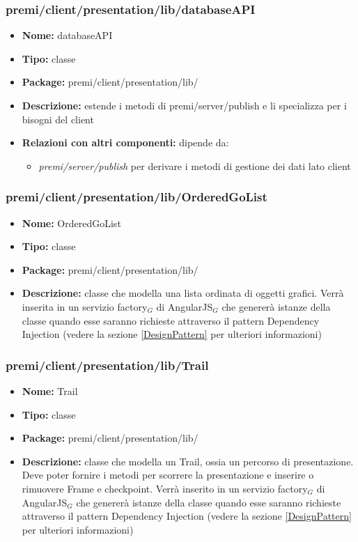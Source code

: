 \subsubsection{premi/client/presentation/lib/databaseAPI}
\begin{itemize}
  \item[] \textbf{Nome:} databaseAPI
  \item[] \textbf{Tipo:} classe
  \item[] \textbf{Package:} premi/client/presentation/lib/
  \item[] \textbf{Descrizione:} estende i metodi di premi/server/publish e li specializza per i bisogni del client
   \item[] \textbf{Relazioni con altri componenti:} dipende da:
 \begin{itemize}
 \item \textit{premi/server/publish} per derivare i metodi di gestione dei dati lato client
 \end{itemize}
\end{itemize}


\subsubsection{premi/client/presentation/lib/OrderedGoList}
\begin{itemize}
  \item[] \textbf{Nome:} OrderedGoList
  \item[] \textbf{Tipo:} classe
  \item[] \textbf{Package:} premi/client/presentation/lib/
  \item[] \textbf{Descrizione:} classe che modella una lista ordinata di oggetti grafici. Verrà inserita in un servizio factory$_G$ di AngularJS$_G$ che genererà istanze della classe quando esse saranno richieste attraverso il pattern Dependency Injection (vedere la sezione \ref{DesignPattern} per ulteriori informazioni)
\end{itemize}
  
\subsubsection{premi/client/presentation/lib/Trail}
\begin{itemize}
  \item[] \textbf{Nome:} Trail
  \item[] \textbf{Tipo:} classe
  \item[] \textbf{Package:} premi/client/presentation/lib/
  \item[] \textbf{Descrizione:} classe che modella un Trail, ossia un percorso di presentazione. Deve poter fornire i metodi per scorrere la presentazione e inserire o rimuovere Frame e checkpoint. Verrà inserito in un servizio factory$_G$ di AngularJS$_G$ che genererà istanze della classe quando esse saranno richieste attraverso il pattern Dependency Injection (vedere la sezione \ref{DesignPattern} per ulteriori informazioni)
\end{itemize}

